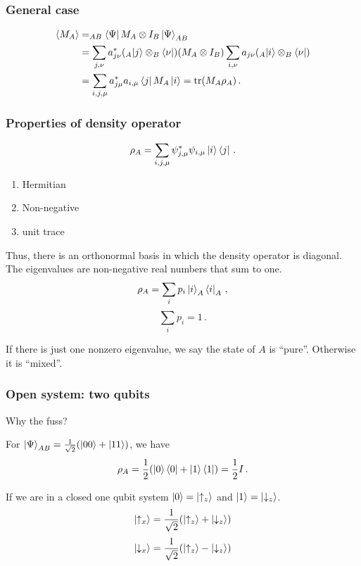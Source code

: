 \documentclass[12pt, aspectratio=169]{beamer}
\begin{document}
\begin{frame}
    \frametitle{General case}
    \begin{align*}
        \langle M_A \rangle &= _{AB}\bra{\Psi } M_A \otimes I_B \ket{\Psi}_{AB} \\
                            & = \sum_{j,\nu} a^*_{j\nu} (_A \ket{j}\otimes _B \bra{\nu}) (M_A \otimes I_B)  \sum_{i,\nu} a_{j\nu} (_A \ket{i}\otimes _B \bra{\nu})\\
                            &= \sum_{i,j,\mu} a^*_{j\mu} a_{i,\mu} \bra{j} M_A \ket{i} = \tr (M_A \rho_A) \,.
    \end{align*}
\end{frame}


\begin{frame}
    \frametitle{Properties of density operator}
    \begin{equation*}
        \rho_A 
        = \sum_{i,j,\mu} \psi^*_{j,\mu} \psi_{i,\mu} \ket{i}\bra{j} \,.
    \end{equation*}
    \begin{enumerate}
        \item Hermitian
        \item Non-negative
        \item unit trace
    \end{enumerate}
    Thus, there is an orthonormal basis in which the density operator is diagonal.
    The eigenvalues are non-negative real numbers that sum to one.
    \begin{equation*}
        \rho_A = \sum_i p_i \ket{i}_A \bra{i}_A \,,
    \end{equation*}
    \begin{equation*}
        \sum_i p_i = 1 \,.
    \end{equation*}

\end{frame}

\begin{frame}
If there is just one nonzero eigenvalue, we say the state of $A$ is ``pure''. Otherwise it is ``mixed''.
\end{frame}

\begin{frame}
    \frametitle{Open system: two qubits}
    Why the fuss?

    For $\ket{\Psi}_{AB} = \frac{1}{\sqrt{2}} (\ket{00} + \ket{11})$, we have
    \begin{equation*}
        \rho_A = \frac{1}{2} (\ket{0}\bra{0} + \ket{1}\bra{1}) = \frac{1}{2} I \,.
    \end{equation*}

    If we are in a closed one qubit system
    $\ket{0} = \ket{\uparrow_z}$ and $\ket{1} = \ket{\downarrow_z}$.
    $$\ket{\uparrow_x} = \frac{1}{\sqrt{2}} ( \ket{\uparrow_z} + \ket{\downarrow_z})$$
    $$\ket{\downarrow_x} = \frac{1}{\sqrt{2}} ( \ket{\uparrow_z} - \ket{\downarrow_z})$$
\end{frame}
\end{document}
